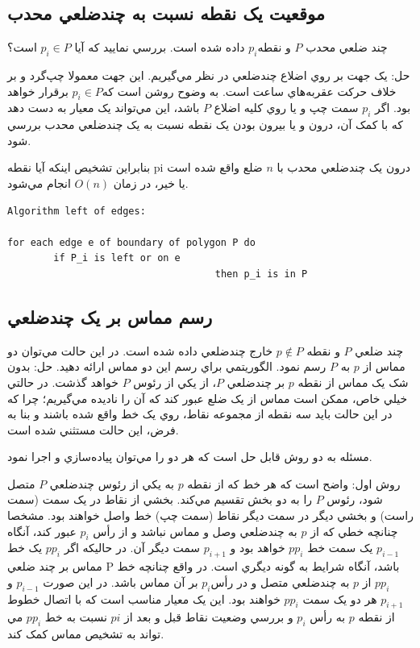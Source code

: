 \documentclass{book}
\begin{document}
\subsection{موقعيت يک نقطه نسبت به چندضلعي محدب}

چند ضلعي محدب $P$  و نقطه$ p_i$ داده شده است. بررسي نماييد که آيا $p_i\in P$  است؟

حل: يک جهت بر روي اضلاع چندضلعي در نظر مي‌گيريم. اين جهت معمولا چپ‌گرد و بر خلاف حرکت عقربه‌هاي ساعت است. به وضوح روشن است که$p_i\in P$  برقرار خواهد بود. اگر $p_i$ سمت چپ و يا روي کليه اضلاع $P$ باشد، اين مي‌تواند يک معيار به دست دهد که با کمک آن، درون و يا بيرون بودن يک نقطه نسبت به يک چندضلعي محدب بررسي شود.

بنابراين تشخيص اينکه آيا نقطه pi درون يک چندضلعي محدب با $n$ ضلع واقع شده است يا خير، در زمان $O(n)$  انجام مي‌شود.

\begin{latin}
\begin{verbatim}
Algorithm left of edges:

for each edge e of boundary of polygon P do
        if P_i is left or on e 
                                    then p_i is in P
\end{verbatim}
\end{latin}

\subsection{رسم مماس بر يک چندضلعي}

چند ضلعي $P$ و نقطه $p \notin P$ خارج چندضلعي داده شده است. در اين حالت مي‌توان دو مماس از $p$  به $P$  رسم نمود. الگوريتمي براي رسم اين دو مماس ارائه دهيد.
حل: بدون شک يک مماس از نقطه $p$  بر چندضلعي $P$، از يکي از رئوس $P$ خواهد گذشت. در حالتي خيلي خاص، ممکن است مماس از يک ضلع عبور کند که آن را ناديده مي‌گيريم؛ چرا که در اين حالت بايد سه نقطه از مجموعه نقاط، روي يک خط واقع شده باشند و بنا به فرض، اين حالت مستثني شده است.

مسئله به دو روش قابل حل است که هر دو را مي‌توان پياده‌سازي و اجرا نمود.

روش اول: واضح است که هر خط که از نقطه $p$  به يکي از رئوس چندضلعي $P$ متصل شود،  رئوس $P$ را به دو بخش تقسيم مي‌کند. بخشي از نقاط در يک سمت (سمت راست)  و بخشي ديگر در سمت ديگر نقاط (سمت چپ) خط واصل خواهند بود. مشخصا چنانچه خطي که از $p$ به چندضلعي وصل و مماس نباشد و از رأس $p_i$  عبور کند، آنگاه $p_{i-1}$ يک سمت خط $pp_i$ خواهد بود و $p_{i+1}$ سمت ديگر آن. در حاليکه اگر $pp_i$ يک خط مماس بر چند ضلعي P باشد، آنگاه شرايط به گونه ديگري است. در واقع چنانچه خط $pp_i$ از $p$ به چندضلعي متصل و در رأس$p_i$  بر آن مماس باشد. در اين صورت $p_{i-1}$ و $p_{i+1}$ هر دو يک سمت $pp_i$ خواهند بود. اين يک معيار مناسب است که با اتصال خطوط از نقطه $p$ به رأس $p_i$ و بررسي وضعيت نقاط قبل و بعد از $pi$ نسبت به خط $pp_i$ مي تواند به تشخيص مماس کمک کند.
\end{document}
